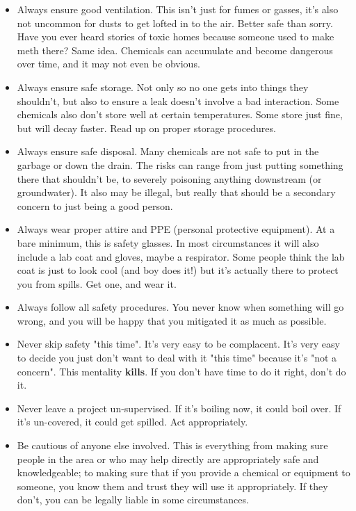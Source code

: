 \documentclass{book}
\begin{document}
\begin{itemize}
\item Always ensure good ventilation.  This isn't just for fumes or gasses, it's also not uncommon for dusts to get lofted in to the air.  Better safe than sorry.  Have you ever heard stories of toxic homes because someone used to make meth there?  Same idea.  Chemicals can accumulate and become dangerous over time, and it may not even be obvious.
\item Always ensure safe storage.  Not only so no one gets into things they shouldn't, but also to ensure a leak doesn't involve a bad interaction.  Some chemicals also don't store well at certain temperatures.  Some store just fine, but will decay faster.  Read up on proper storage procedures.
\item Always ensure safe disposal.  Many chemicals are not safe to put in the garbage or down the drain.  The risks can range from just putting something there that shouldn't be, to severely poisoning anything downstream (or groundwater).  It also may be illegal, but really that should be a secondary concern to just being a good person.
\item Always wear proper attire and PPE (personal protective equipment).  At a bare minimum, this is safety glasses.  In most circumstances it will also include a lab coat and gloves, maybe a respirator.  Some people think the lab coat is just to look cool (and boy does it!) but it's actually there to protect you from spills.  Get one, and wear it.
\item Always follow all safety procedures.  You never know when something will go wrong, and you will be happy that you mitigated it as much as possible.
\item Never skip safety "this time".  It's very easy to be complacent.  It's very easy to decide you just don't want to deal with it "this time" because it's "not a concern".  This mentality \textbf{kills}.  If you don't have time to do it right, don't do it.
\item Never leave a project un-supervised.  If it's boiling now, it could boil over.  If it's un-covered, it could get spilled.  Act appropriately.
\item Be cautious of anyone else involved.  This is everything from making sure people in the area or who may help directly are appropriately safe and knowledgeable; to making sure that if you provide a chemical or equipment to someone, you know them and trust they will use it appropriately.  If they don't, you can be legally liable in some circumstances.

\end{itemize}
\end{document}
